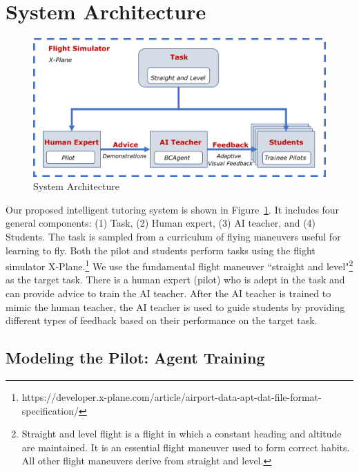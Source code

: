 \documentclass[letterpaper]{article} %
\begin{document}
\section{System Architecture}
\begin{figure}[t]
	\begin{minipage}{1\linewidth}
		\centering \small
		\includegraphics[width=\textwidth]{img/system1.pdf}
		\caption{System Architecture}
		\label{fig:system}
	\end{minipage}
\end{figure}

Our proposed intelligent tutoring system is shown in Figure~\ref{fig:system}. It includes four general components: (1) Task, (2) Human expert, (3) AI teacher, and (4) Students. The task is sampled from a curriculum of flying maneuvers useful for learning to fly. Both the pilot and students perform tasks using the flight simulator X-Plane.\footnote{https://developer.x-plane.com/article/airport-data-apt-dat-file-format-specification/} We use the fundamental flight maneuver ``straight and level"\footnote{\label{note1}Straight and level flight is a flight in which a constant heading and altitude are maintained. It is an essential flight maneuver used to form correct habits. All other flight maneuvers derive from straight and level.} as the target task. There is a human expert (pilot) who is adept in the task and can provide advice to train the AI teacher. After the AI teacher is trained to mimic the human teacher, the AI teacher is used to guide students by providing different types of feedback based on their performance on the target task.

\subsection{Modeling the Pilot: Agent Training}
\end{document}
